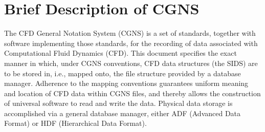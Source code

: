 \section{Brief Description of CGNS}
\label{s:brief}
\thispagestyle{plain}

The CFD General Notation System (CGNS) is a set of standards, together
with software implementing those standards, for the recording of data
associated with Computational Fluid Dynamics (CFD).
This document specifies the exact manner in which,
under CGNS conventions, CFD data structures (the SIDS) are to be
stored in, i.e., mapped onto, the file structure provided by a
database manager. Adherence to the mapping conventions guarantees
uniform meaning and location of CFD data within CGNS files,
and thereby allows the construction of universal software to
read and write the data.
Physical data storage is accomplished via a general database manager,
either ADF (Advanced Data Format) or HDF (Hierarchical Data Format).

